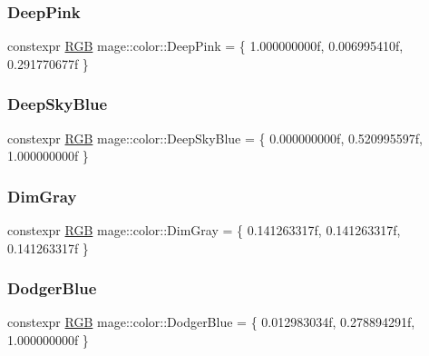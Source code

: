 \subsubsection{\texorpdfstring{Deep\+Pink}{DeepPink}}
{\footnotesize\ttfamily constexpr \hyperlink{structmage_1_1_r_g_b}{R\+GB} mage\+::color\+::\+Deep\+Pink = \{ 1.\+000000000f, 0.\+006995410f, 0.\+291770677f \}}

\hypertarget{namespacemage_1_1color_a6a122d439d2206202dc3078cf8bb645f}{}\label{namespacemage_1_1color_a6a122d439d2206202dc3078cf8bb645f} 
\subsubsection{\texorpdfstring{Deep\+Sky\+Blue}{DeepSkyBlue}}
{\footnotesize\ttfamily constexpr \hyperlink{structmage_1_1_r_g_b}{R\+GB} mage\+::color\+::\+Deep\+Sky\+Blue = \{ 0.\+000000000f, 0.\+520995597f, 1.\+000000000f \}}

\hypertarget{namespacemage_1_1color_a74d9b984f9bc60a90b9d7eb6debce8ca}{}\label{namespacemage_1_1color_a74d9b984f9bc60a90b9d7eb6debce8ca} 
\subsubsection{\texorpdfstring{Dim\+Gray}{DimGray}}
{\footnotesize\ttfamily constexpr \hyperlink{structmage_1_1_r_g_b}{R\+GB} mage\+::color\+::\+Dim\+Gray = \{ 0.\+141263317f, 0.\+141263317f, 0.\+141263317f \}}

\hypertarget{namespacemage_1_1color_ad5375c3554ad1719cb3cb199ad0eb9ee}{}\label{namespacemage_1_1color_ad5375c3554ad1719cb3cb199ad0eb9ee} 
\subsubsection{\texorpdfstring{Dodger\+Blue}{DodgerBlue}}
{\footnotesize\ttfamily constexpr \hyperlink{structmage_1_1_r_g_b}{R\+GB} mage\+::color\+::\+Dodger\+Blue = \{ 0.\+012983034f, 0.\+278894291f, 1.\+000000000f \}}

\hypertarget{namespacemage_1_1color_add7b65bdb6d5f690222f8be205a5b028}{}\label{namespacemage_1_1color_add7b65bdb6d5f690222f8be205a5b028} 
